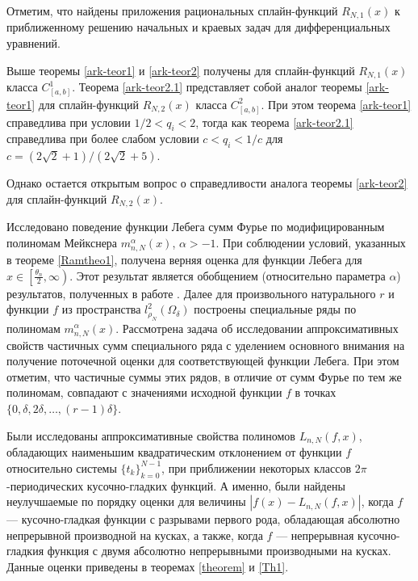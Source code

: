 Отметим, что найдены приложения рациональных сплайн-функций $R_{N,1}(x)$ к  приближенному
решению начальных и краевых задач для дифференциальных уравнений.

Выше теоремы \ref{ark-teor1} и \ref{ark-teor2} получены для сплайн-функций $R_{N,1}(x)$ класса
$C^1_{[a,b]}$.
Теорема \ref{ark-teor2.1} представляет собой аналог теоремы \ref{ark-teor1} для сплайн-функций
$R_{N,2}(x)$ класса $C^2_{[a,b]}$. При этом теорема \ref{ark-teor1} справедлива
при условии $1/2<q_i<2$, тогда как теорема \ref{ark-teor2.1} справедлива при более
слабом условии $c<q_i<1/c$ для $c=(2\sqrt 2+1)/(2\sqrt 2+5)$.

Однако остается открытым вопрос о справедливости аналога теоремы  \ref{ark-teor2} для сплайн-функций
$R_{N,2}(x)$.

Исследовано поведение функции Лебега сумм Фурье по модифицированным полиномам Мейкснера $m_{n,N}^{\alpha}(x)$, $\alpha>-1$. При соблюдении условий, указанных в теореме \ref{Ramtheo1}, получена верняя оценка для функции Лебега для $x\in\left[\frac{\theta_n}{2}, \infty\right)$. Этот результат является обобщением (относительно параметра $\alpha$) результатов, полученных в работе \cite{Ram3}. Далее для произвольного натурального $r$  и функции $f$ из пространства $l_{\rho_N}^2(\Omega_\delta)$ построены специальные ряды по полиномам $m_{n,N}^{\alpha}(x)$. Рассмотрена задача об исследовании аппроксимативных свойств частичных сумм специального ряда с уделением основного внимания на получение поточечной оценки для соответствующей функции Лебега. При этом отметим, что частичные суммы этих рядов, в отличие от сумм Фурье по тем же полиномам, совпадают с значениями исходной функции $f$ в точках $\{0, \delta, 2\delta, \ldots, (r-1)\delta\}$.



Были исследованы аппроксимативные свойства полиномов $L_{n,N}(f,x)$, обладающих наименьшим квадратическим отклонением
от функции $f$ относительно системы $\{t_k\}_{k=0}^{N-1}$, при приближении некоторых классов  $2\pi$-периодических
кусочно-гладких функций. А именно, были найдены неулучшаемые по порядку оценки для величины \linebreak $\left|f(x)-L_{n,N}(f,x)\right|$, когда
$f$ --- кусочно-гладкая функции с разрывами первого рода, обладающая абсолютно
непрерывной производной на кусках, а также, когда $f$ --- непрерывная кусочно-гладкия функция с двумя абсолютно непрерывными
производными на кусках. Данные оценки приведены в теоремах \ref{theorem} и \ref{Th1}.



